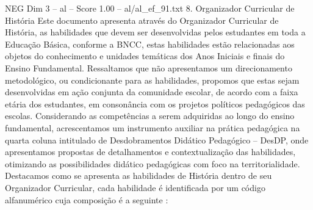 \begin{textsample}{NEG Dim 3 – al – Score 1.00 – al/al\_ef\_91.txt}  \label{ex:f3_neg_079}
8.
Organizador Curricular de História Este documento apresenta através do Organizador Curricular de História, as habilidades que devem ser desenvolvidas pelos estudantes em toda a Educação Básica, conforme a BNCC, estas habilidades estão relacionadas aos objetos do conhecimento e unidades temáticas dos Anos Iniciais e finais do Ensino Fundamental.
Ressaltamos que não apresentamos um direcionamento metodológico, ou condicionante para as habilidades, propomos que estas sejam desenvolvidas em ação conjunta da comunidade escolar, de acordo com a faixa etária dos estudantes, em consonância com os projetos políticos pedagógicos das escolas.
Considerando as competências a serem adquiridas ao longo do ensino fundamental, acrescentamos um instrumento auxiliar na prática pedagógica na quarta coluna intitulado de Desdobramentos Didático Pedagógico – DesDP, onde apresentamos propostas de detalhamentos e contextualização das habilidades, otimizando as possibilidades didático pedagógicas com foco na territorialidade.
Destacamos como se apresenta as habilidades de História dentro de seu Organizador Curricular, cada habilidade é identificada por um código alfanumérico cuja composição é a seguinte :

\end{textsample}
